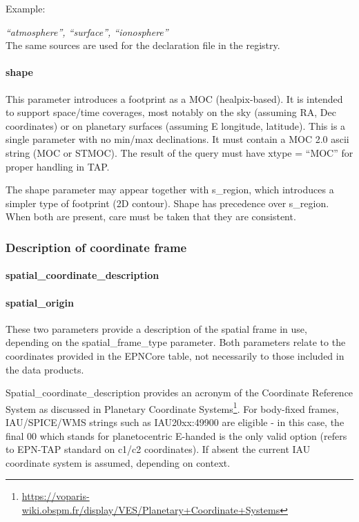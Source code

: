 \documentclass[11pt,a4paper]{ivoa}
\begin{document}
Example: 

\emph{``atmosphere'', ``surface'', ``ionosphere''}\\The same sources are used for the declaration file in the registry.

\paragraph{shape}

This parameter introduces a footprint as a MOC (healpix-based). It is intended to support space/time coverages, most notably on the sky (assuming RA, Dec coordinates) or on planetary surfaces (assuming E longitude, latitude). This is a single parameter with no min/max declinations. It must contain a MOC 2.0 ascii string (MOC or STMOC). The result of the query must have xtype = ``MOC'' for proper handling in TAP.

The shape parameter may appear together with s\_region, which introduces a simpler type of footprint (2D contour). Shape has precedence over s\_region. When both are present, care must be taken that they are consistent.

\subsubsection{Description of coordinate frame}

\paragraph{spatial\_coordinate\_description}

\paragraph{spatial\_origin}

These two parameters provide a description of the spatial frame in use, depending on the spatial\_frame\_type parameter. Both parameters relate to the coordinates provided in the EPNCore table, not necessarily to those included in the data products. 

Spatial\_coordinate\_description provides an acronym of the Coordinate Reference System as discussed in Planetary Coordinate Systems\footnote{\url{https://voparis-wiki.obspm.fr/display/VES/Planetary+Coordinate+Systems}}. For body-fixed frames, IAU/SPICE/WMS strings such as IAU20xx:49900 are eligible - in this case, the final 00 which stands for planetocentric E-handed is the only valid option (refers to EPN-TAP standard on c1/c2 coordinates). If absent the current IAU coordinate system is assumed, depending on context. 
\end{document}
